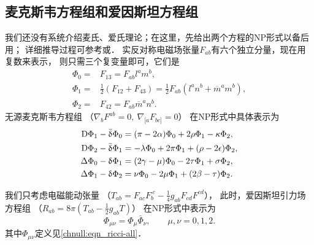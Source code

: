 
\subsection{麦克斯韦方程组和爱因斯坦方程组}
我们还没有系统介绍麦氏、爱氏理论；在这里，先给出两个方程的NP形式以备后用；
详细推导过程可参考\parencite[\S 1.8(f)]{chandrasekhar-1983}或\parencite{newman-Penrose-1962}．
实反对称电磁场张量$F_{ab}$有六个独立分量，现在用复数来表示，
则只需三个复变量即可，它们是
\begin{subequations}
    \begin{align}
        \Phi_{0}=&F_{13}=F_{ab}l^{a}m^{b},\\
        \Phi_{1}=&\frac{1}{2}(F_{12}+F_{43})=\frac{1}{2}F_{ab}(l^{a}n^{b}+\overline{m}^{a}m^{b}),\\
        \Phi_{2}=&F_{42}=F_{ab}\overline{m}^{a}n^{b}.
    \end{align}
\end{subequations}
无源麦克斯韦方程组
（$\nabla_b F^{ab}= 0 , \ \nabla_{[a} F_{ bc ] } =0 $）
在NP形式中具体表示为
\begin{subequations}\label{chnull:eqn_maxwell-4Q}
    \begin{align}
        {\rm D}\Phi_1 -\bar{\updelta}\Phi_0 &=(\pi-2\alpha)\Phi_0+2\rho\Phi_1-\kappa\Phi_2 , \\
        {\rm D}\Phi_2 -\bar{\updelta}\Phi_1 &=-\lambda\Phi_0+2\pi\Phi_1+(\rho-2\epsilon)\Phi_2 ,   \\
        \Delta\Phi_0-\updelta\Phi_1 &=(2\gamma-\mu)\Phi_0-2\tau\Phi_1+\sigma\Phi_2,  \\
        \Delta\Phi_1-\updelta\Phi_2 &=\nu\Phi_0-2\mu\Phi_1+(2\beta-\tau)\Phi_2 .\label{chnull:eqn_maxwell-4Q-d}
    \end{align}
\end{subequations}




我们只考虑电磁能动张量 %
（$T_{ab}= F_{ac} F_{b}^{\cdot c} - \frac{1}{4} g_{ab} F_{cd} F^{cd} $），
此时，爱因斯坦引力场方程组 %
（$R_{ab} = 8\pi (T_{ab} - \frac{1}{2}g_{ab}T )$）
在NP形式中表示为
\begin{equation}\label{chnull:eqn_einstein-4Q}
    \Phi_{\mu\nu} = \Phi_{\mu}\bar{\Phi}_{\nu}, \qquad
    \mu, \nu =0, 1, 2.
\end{equation}
其中$\Phi_{\mu\nu}$定义见\eqref{chnull:eqn_ricci-all}．






